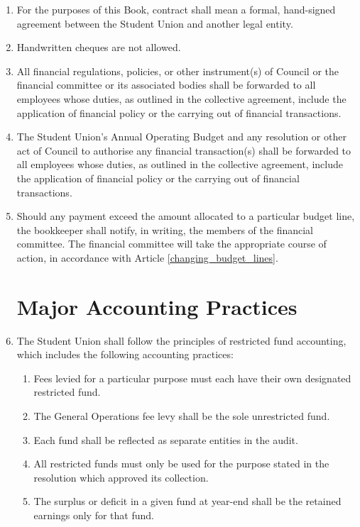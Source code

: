 \documentclass[oneside]{book}
\begin{document}
\begin{enumerate}
\item For the purposes of this Book, contract shall mean a formal, hand-signed agreement between the Student Union and another legal entity.
\item Handwritten cheques are not allowed.
\item All financial regulations, policies,
or other instrument(s) of Council or the financial committee or its associated bodies shall be forwarded to all
employees whose duties, as outlined in the collective agreement, include the application of financial policy
or the carrying out of financial transactions.
\item The Student Union’s Annual
Operating Budget and any resolution or other act of Council to authorise any financial transaction(s) shall be
forwarded to all employees whose duties, as outlined in the collective agreement, include the application of
financial policy or the carrying out of financial transactions.
\item Should any payment exceed the amount allocated to a particular budget line, the bookkeeper shall notify, in writing, the members of the financial committee. The financial committee will take the appropriate course of action, in accordance with Article \ref{changing_budget_lines}.

\chapter{\label{Major_Accounting_Practices}Major Accounting Practices }

\item The Student Union shall follow the principles of restricted fund accounting, which includes the following accounting practices:

\begin{enumerate}
\item Fees levied for a particular purpose must each have their own designated restricted fund.
\item The General Operations fee levy shall be the sole unrestricted fund.
\item Each fund shall be reflected as separate entities in the audit.
\item All restricted funds must only be used for the purpose stated in the resolution which approved its collection.
\item The surplus or deficit in a given fund at year-end shall be the retained earnings only for that fund.
\end{enumerate}


\end{enumerate}
\end{document}
